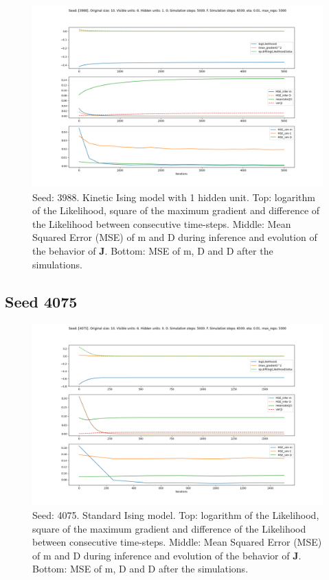 \documentclass{article}
\def\*#1{\mathbf{#1}}
\begin{document}
\begin{figure}[!htb]
    \centering
    \includegraphics[width=0.8\linewidth]{images/sqrt_size/[3988]_10_6_1_5000_6500_eta001_5000_100.png}
\caption{Seed: 3988. Kinetic Ising model with 1 hidden unit. Top: logarithm of the Likelihood, square of the maximum gradient and difference of the Likelihood between consecutive time-steps. Middle: Mean Squared Error (MSE) of m and D during inference and evolution of the behavior of $\*J$. Bottom: MSE of m, D and D after the simulations.}
\end{figure}





\newpage
\subsection{Seed 4075}

\begin{figure}[!htb]
    \centering
    \includegraphics[width=0.8\linewidth]{images/sqrt_size/[4075]_10_6_0_5000_6500_eta001_5000_100.png}
\caption{Seed: 4075. Standard Ising model. Top: logarithm of the Likelihood, square of the maximum gradient and difference of the Likelihood between consecutive time-steps. Middle: Mean Squared Error (MSE) of m and D during inference and evolution of the behavior of $\*J$. Bottom: MSE of m, D and D after the simulations.}
\end{figure}
\end{document}
